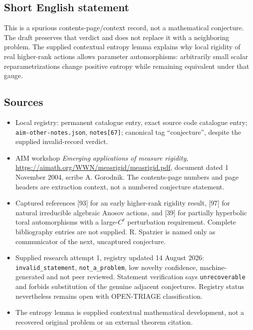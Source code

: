 \documentclass[11pt]{article}
\begin{document}
\subsection{Short English statement}
This is a spurious contents-page/context record, not a mathematical conjecture. The draft preserves that verdict and does not replace it with a neighboring problem. The supplied contextual entropy lemma explains why local rigidity of real higher-rank actions allows parameter automorphisms: arbitrarily small scalar reparametrizations change positive entropy while remaining equivalent under that gauge.
\subsection{Sources}
\begin{itemize}
\item Local registry: permanent catalogue entry, exact source code catalogue entry; \texttt{aim-other-notes.json}, \texttt{notes[67]}; canonical tag ``conjecture'', despite the supplied invalid-record verdict.
\item AIM workshop \emph{Emerging applications of measure rigidity}, \url{https://aimath.org/WWN/measrigid/measrigid.pdf}, document dated 1 November 2004, scribe A. Gorodnik. The contents-page numbers and page headers are extraction context, not a numbered conjecture statement.
\item Captured references [93] for an early higher-rank rigidity result, [97] for natural irreducible algebraic Anosov actions, and [39] for partially hyperbolic toral automorphisms with a large-$C^\ell$ perturbation requirement. Complete bibliography entries are not supplied. R. Spatzier is named only as communicator of the next, uncaptured conjecture.
\item Supplied research attempt 1, registry updated 14 August 2026: \texttt{invalid\_statement}, \texttt{not\_a\_problem}, low novelty confidence, machine-generated and not peer reviewed. Statement verification says \texttt{unrecoverable} and forbids substitution of the genuine adjacent conjectures. Registry status nevertheless remains open with OPEN-TRIAGE classification.
\item The entropy lemma is supplied contextual mathematical development, not a recovered original problem or an external theorem citation.
\end{itemize}
\end{document}
